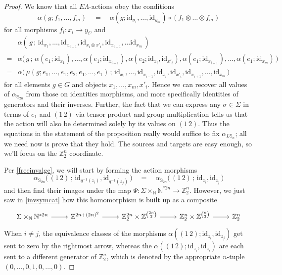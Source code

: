 \documentclass{amsbook} %
\newcommand{\id}{\textrm{id}}
\numberwithin{section}{chapter}
\begin{document}
\begin{proof}
We know that all $E\Lambda$-actions obey the conditions
\[ \alpha(g; f_1, \ldots, f_m) \quad = \quad \alpha(g; \id_{y_1}, \ldots, \id_{y_m}) \circ (f_1 \otimes \ldots \otimes f_m) \]
for all morphisms $f_i \colon  x_i \to y_i$, and
\[ \begin{array}{rl}
			& \alpha( \, g \, ; \, \id_{x_1}, \ldots, \id_{x_{i-1}}, \id_{x_i \otimes x'_{i}}, \id_{x_{i+1}}, \ldots \id_{x_m} \, ) \\
			= & \alpha\big( \, g \, ; \, \alpha(e_1;\id_{x_1}), \ldots, \alpha(e_1;\id_{x_{i-1}}), \alpha(e_2;\id_{x_i}, \id_{x'_i}), \alpha(e_1;\id_{x_{i+1}}), \ldots,  \alpha(e_1;\id_{x_m}) \, \big) \\
			= & \alpha\big( \, \mu(g; e_1, \ldots, e_1, e_2, e_1, \ldots, e_1) \, ; \, \id_{x_1}, \ldots, \id_{x_{i-1}}, \id_{x_i}, \id_{x'_{i}}, \id_{x_{i+1}}, \ldots, \id_{x_m} \, \big)
		\end{array}
\]
for all elements $g \in G$ and objects $x_1, \ldots, x_m, x'_i$. Hence we can recover all values of $\alpha_{\mathbb{S}_{2n}}$ from those on identities morphisms, and more specifically identities of generators and their inverses. Further, the fact that we can express any $\sigma \in \Sigma$ in terms of $e_1$ and $(1 \, 2)$ via tensor product and group multiplication tells us that the action will also be determined solely by its values on $(1 \, 2)$. Thus the equations in the statement of the proposition really would suffice to fix $\alpha_{L\mathbb{S}_n}$; all we need now is prove that they hold. The sources and targets are easy enough, so we'll focus on the $\mathbb{Z}_2^{n}$ coordinate.

Per \cref{freeinvalgc}, we will start by forming the action morphisms
\[ \alpha_{\mathbb{S}_{2n}}\big( \, (1 \, 2) \, ; \, \id_{q^{-1}(z_i)}, \id_{q^{-1}(z_j)} \, \big) \quad = \quad \alpha_{\mathbb{S}_{2n}}\big( \, (1 \, 2) \, ; \, \id_{z_i}, \id_{z_j} \, \big) \]
and then find their images under the map $\Psi \colon  \Sigma \times_{\mathbb{N}} \mathbb{N}^{\ast 2n} \to \mathbb{Z}_2^{n}$. However, we just saw in \cref{invsymcat} how this homomorphism is built up as a composite
\[ \begin{tikzcd}
 \Sigma \times_{\mathbb{N}} \mathbb{N}^{\ast 2n} \ar[r] & \mathbb{Z}^{2n + (2n)^2} \ar[r] & \mathbb{Z}_2^{2n} \times \mathbb{Z}^{{2n}\choose{2}} \ar[r] & \mathbb{Z}_2^{n} \times \mathbb{Z}^{{n}\choose{2}}  \ar[r] & \mathbb{Z}_2^{n}
\end{tikzcd} \]
When $i \neq j$, the equivalence classes of the morphisms $\alpha((1 \, 2);\id_{z_i}, \id_{z_j})$ get sent to zero by the rightmost arrow, whereas the $\alpha((1 \, 2);\id_{z_i}, \id_{z_i})$ are each sent to a different generator of $\mathbb{Z}_2^{n}$, which is denoted by the appropriate $n$-tuple $(0,\ldots,0, 1, 0,\ldots,0)$. 


\end{proof}
\end{document}
